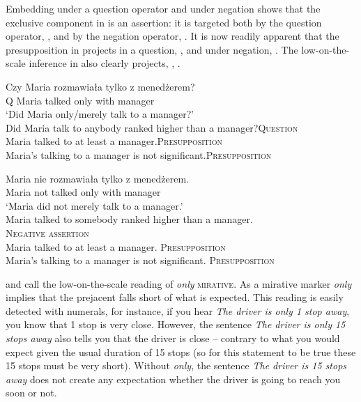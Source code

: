 \documentclass[output=paper,colorlinks,citecolor=brown]{langscibook}
\begin{document}
\noindent Embedding under a question operator and under negation shows that the exclusive component in  is an assertion: it is targeted both by the question operator, , and by the negation operator, . %
It is now readily apparent that the presupposition in  projects in a question, , and under negation, .
The low-on-the-scale inference in  also clearly projects, , . 


\ea\label{ex:tom:27}
\gll Czy Maria rozmawiała tylko z menedżerem?\\  
Q Maria talked only with manager\\
\glt `Did Maria only/merely talk to a manager?’\\
\ea\label{ex:tom:27a}
Did Maria talk to anybody ranked higher than a manager?\hfill \textsc{Question}\\
\ex\label{ex:tom:27b}
Maria talked to at least a manager.\hfill \textsc{Presupposition}\\
\ex\label{ex:tom:27c} 
Maria’s talking to a manager is not significant.\hfill\textsc{Presupposition}
\z 
\z 

\ea\label{ex:tom:28}
\gll Maria nie rozmawiała tylko z menedżerem.\\  
Maria not talked only with manager\\
\glt `Maria did not merely talk to a manager.’\\
\ea\label{ex:tom:28a}
Maria talked to somebody ranked higher than a manager.  \\\hfill \textsc{Negative assertion}\\  
\ex\label{ex:tom:28b}
Maria talked to at least a manager. \hfill \textsc{Presupposition}\\
\ex\label{ex:tom:28c}
Maria’s talking to a manager is not significant. \hfill \textsc{Presupposition} 
\z 
\z

\noindent \citet{beaverclark08} and \citet{zeevat09} call the low-on-the-scale reading of \textit{only} \textsc{mirative}. As a mirative marker \textit{only} implies that the prejacent falls short of what is expected. This reading is easily detected with numerals, for instance, if you hear \textit{The driver is only 1 stop away}, you know that 1 stop is very close. However, the sentence \textit{The driver is only 15 stops away} also tells you that the driver is close -- contrary to what you would expect given the usual duration of 15 stops (so for this statement to be true these 15 stops must be very short). Without \textit{only}, the sentence \textit{The driver is 15 stops away} does not create any expectation whether the driver is going to reach you soon or not.
\end{document}
